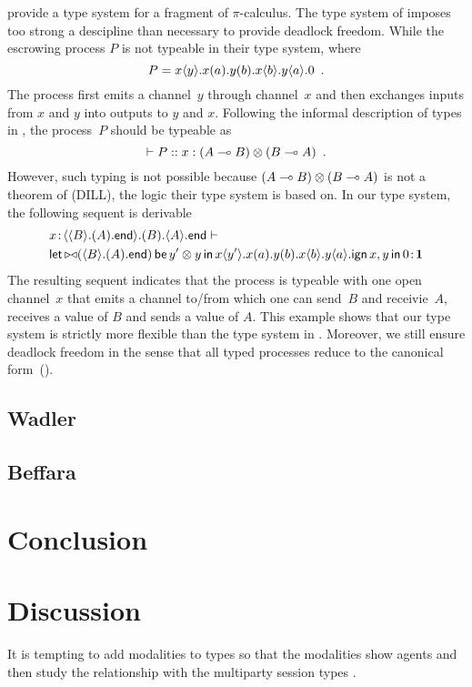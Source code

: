 \citet{pfenning2010} provide a type system for a fragment of $\pi$-calculus.
The type system of \citet{pfenning2010} imposes too strong a descipline
than necessary to provide deadlock freedom.
While the escrowing process $P$ is not typeable in their type
system, where
\[
 P = {x}\langle{y}\rangle.{{{x}({a}).{{{y}({b}).{{x}\langle{b}\rangle.{{y}\langle{a}\rangle.{0}}}}}}}\enspace.
\]
The process first emits a channel~$y$ through channel~$x$ and then
exchanges inputs from $x$ and $y$ into outputs to $y$ and $x$.
Following the informal description of types in \citep{pfenning2010},
the process~$P$ should be typeable as
\[
 \vdash P::x:(A\multimap B)\otimes(B\multimap A)\enspace.
\]
However, such typing is not possible because $(A\multimap B)\otimes (B\multimap
A)$ is not a theorem of  (DILL), the logic their type system
is based on.
In our type system, the following sequent is derivable
\begin{align*}
&
{x} \mathord{\colon\kern -2pt}{\langle{\langle{B}\rangle.{(A).{\mathsf{end}}}}\rangle.{(B).{\langle{A}\rangle.{\mathsf{end}}}}}
\vdash\\
&{
\mathsf{let }\,{\mathop{\triangleright\triangleleft}(\langle{B}\rangle.{(A).{\mathsf{end}}})}\,\mathsf{ be }\,{y'\otimes y}\,\mathsf{ in }\,{{x}\langle{y'}\rangle.{{{x}({a}).{{{y}({b}).{{x}\langle{b}\rangle.{{y}\langle{a}\rangle.{\mathsf{ign }\,{x,y}\,\mathsf{ in }\,{0}}}}}}}}}
} \mathord{\colon\kern -2pt}{\mathbf{1}}
\end{align*}
The resulting sequent indicates that the process is typeable with one
open channel~$x$ that emits
a channel to/from which one can send~$B$ and receivie~$A$, receives a
value of $B$ and
sends a value of $A$.
This example shows that our type system is strictly more flexible than
the type system in \citet{pfenning2010}.
Moreover, we still ensure deadlock freedom in the sense that all typed
processes reduce to the canonical form~().

\subsection{Wadler}

\subsection{Beffara}

\section{Conclusion}


\section{Discussion}

It is tempting to add modalities to types so that the
modalities show agents and then study the relationship with the
multiparty session types .

